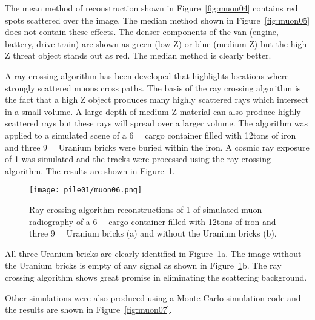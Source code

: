 \documentclass[twoside,titlepage,11pt,twocolumn,a4paper]{article}
\begin{document}
The mean method of reconstruction shown in Figure~\ref{fig:muon04}
contains red spots scattered over the image.  The median method shown
in Figure~\ref{fig:muon05} does not contain these effects. The denser
components of the van (engine, battery, drive train) are shown as
green (low Z) or blue (medium Z) but the high Z threat object stands out
as red. The median method is clearly
better. \citep{statisticalRec2007}

A ray crossing algorithm has been developed that highlights locations
where strongly scattered muons cross paths. The basis of the ray
crossing algorithm is the fact that a high Z object produces many
highly scattered rays which intersect in a small volume. A large depth
of medium Z material can also produce highly scattered rays but these
rays will spread over a larger volume. The algorithm was applied to a
simulated scene of a \unit{6}{\cubic\metre} cargo
container filled with \unit{12}{tons} of iron and three
\unit{9}{\cubic{\centi\metre}} Uranium bricks were
buried within the iron. A cosmic ray exposure of \unit{1}{\minute} was
simulated and the tracks were processed using the ray crossing
algorithm. The results are shown in
Figure~\ref{fig:muon06}. \citep{imageRec2004}

\begin{figure}
  \texttt{[image: pile01/muon06.png]}
  \caption{Ray crossing algorithm reconstructions of \unit{1}{\minute}
    of simulated muon radiography of a
    \unit{6}{\cubic\metre} cargo container filled
    with \unit{12}{tons} of iron and three
    \unit{9}{\cubic{\centi\metre}} Uranium bricks (a)
    and without the Uranium bricks (b). \citep{imageRec2004}}
  \label{fig:muon06}
\end{figure}

All three Uranium bricks are clearly identified in
Figure~\ref{fig:muon06}a. The image without the Uranium bricks is
empty of any signal as shown in Figure~\ref{fig:muon06}b. The ray
crossing algorithm shows great promise in eliminating the scattering
background. \citep{imageRec2004}

Other simulations were also produced using a Monte Carlo simulation
code and the results are shown in Figure~\ref{fig:muon07}.
\end{document}
